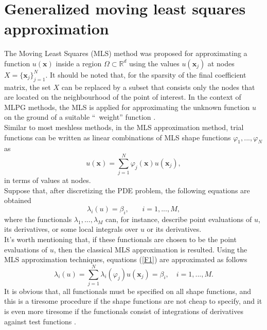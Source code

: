 \documentclass[12pt]{article}
\numberwithin{equation}{section}
\begin{document}
\section{Generalized moving least squares approximation}
The Moving Least Squares (MLS) method \cite{Abbaszadeh3,Lancaster,Li,Liew} was
proposed for approximating a function $u(\mathbf{x})$ inside a region $\Omega\subset \mathbb{R}^{d}$ using the values $u(\mathbf{x}_{j})$ at nodes $X=\{\mathbf{x}_{j}\}_{j=1}^{N}$. It should be noted that, for the sparsity of the final coefficient matrix, the set $X$ can be
replaced by a subset that consists only the nodes that are located on the neighbourhood of the point of interest.
In the context of MLPG methods, the MLS  is applied for approximating the unknown function $u$ on the ground of a suitable ``\ weight''
function \cite{Liu}. \\
Similar to most meshless methods, in the MLS approximation method, trial functions can be written as linear combinations of MLS shape functions ${\varphi _1},...,{\varphi _N}$ as
\begin{equation}
u(\mathbf{x}) = \sum\limits_{j = 1}^N {{\varphi _j}(\mathbf{x})u({\mathbf{x}_j})},\end{equation}
in terms of values at nodes.\\
Suppose that, after discretizing the PDE problem, the following equations are obtained
\begin{equation}\label{F1}
{\lambda _i}(u) = {\beta _i},\,\,\,\,\,\,\,\,\,\,\, i=1,...,M,
\end{equation}
where the functionals ${\lambda _1},...,{\lambda _M}$ can, for instance, describe point evaluations of $u$, its derivatives, or some local integrals over $u$ or its derivatives.\\ It's worth mentioning that, if these functionals are chosen to be the
point evaluations of $u$, then the classical MLS approximation is resulted.
Using the MLS approximation techniques, equations (\ref{F1}) are approximated as follows
\begin{equation}
{\lambda _i}(u) = \sum\limits_{j = 1}^N {{\lambda _i}({\varphi _j})u({\mathbf{x}_j})}  = {\beta _i},\,\,\,\,\,\,i=1,...,M.\end{equation}
It is obvious that, all functionals must be
specified on all shape functions, and this is a tiresome procedure
if the shape functions are not cheap to specify, and it is even more tiresome if the
functionals consist of integrations of derivatives against test functions \cite{MirzaeiH}.\\
\end{document}
